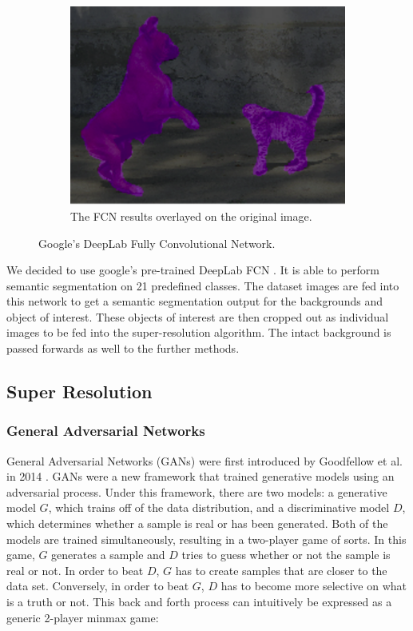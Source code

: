 \begin{figure}
	\begin{subfigure}[h]{0.4\textwidth}
		\centering
		\includegraphics[width=\textwidth]{images/fcn-overlay.png}
		\caption{The FCN results overlayed on the original image.}
		\label{fig:fcn-overlay}
	\end{subfigure}

	\caption{Google's DeepLab Fully Convolutional Network.}
	\label{fig:fcn}
\end{figure}

We decided to use google’s pre-trained DeepLab FCN \cite{Chen2017}. It is able to perform
semantic segmentation on 21 predefined classes. The dataset images are fed into
this network to get a semantic segmentation output for the backgrounds and
object of interest. These objects of interest are then cropped out as individual
images to be fed into the super-resolution algorithm. The intact background is
passed forwards as well to the further methods.


\subsection{Super Resolution}
\subsubsection{General Adversarial Networks}
General Adversarial Networks (GANs) were first introduced by Goodfellow et al.
in 2014 \cite{Goodfellow2014}. GANs were a new framework that trained generative
models using an adversarial process. Under this framework, there are two models:
a generative model $G$, which trains off of the data distribution, and a
discriminative model $D$, which determines whether a sample is real or has been
generated. Both of the models are trained simultaneously, resulting in a
two-player game of sorts. In this game, $G$ generates a sample and $D$ tries to
guess whether or not the sample is real or not. In order to beat $D$, $G$ has to
create samples that are closer to the data set. Conversely, in order to beat $G$,
$D$ has to become more selective on what is a truth or not. This back and forth
process can intuitively be expressed as a generic 2-player minmax game:

